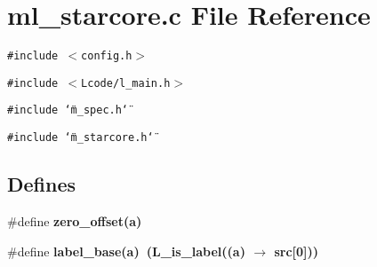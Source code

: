 \section{ml\_\-starcore.c File Reference}
\label{ml__starcore_8c}
{\tt \#include $<$config.h$>$}\par
{\tt \#include $<$Lcode/l\_\-main.h$>$}\par
{\tt \#include \char`\"{}m\_\-spec.h\char`\"{}}\par
{\tt \#include \char`\"{}m\_\-starcore.h\char`\"{}}\par
\subsection*{Defines}
\begin{CompactItemize}
\item 
\#define \bf{zero\_\-offset}(a)
\item 
\#define \bf{label\_\-base}(a)~(L\_\-is\_\-label((a) $\rightarrow$ src[0]))
\end{CompactItemize}
